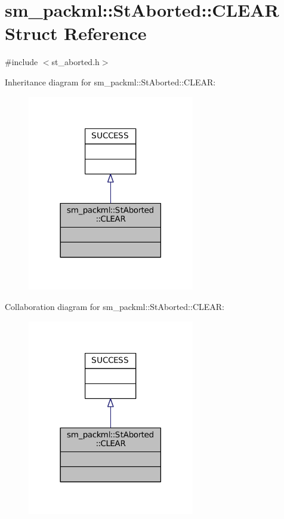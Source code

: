 \hypertarget{structsm__packml_1_1StAborted_1_1CLEAR}{}\section{sm\+\_\+packml\+:\+:St\+Aborted\+:\+:C\+L\+E\+AR Struct Reference}
\label{structsm__packml_1_1StAborted_1_1CLEAR}


{\ttfamily \#include $<$st\+\_\+aborted.\+h$>$}



Inheritance diagram for sm\+\_\+packml\+:\+:St\+Aborted\+:\+:C\+L\+E\+AR\+:
\nopagebreak
\begin{figure}[H]
\begin{center}
\leavevmode
\includegraphics[width=206pt]{structsm__packml_1_1StAborted_1_1CLEAR__inherit__graph}
\end{center}
\end{figure}


Collaboration diagram for sm\+\_\+packml\+:\+:St\+Aborted\+:\+:C\+L\+E\+AR\+:
\nopagebreak
\begin{figure}[H]
\begin{center}
\leavevmode
\includegraphics[width=206pt]{structsm__packml_1_1StAborted_1_1CLEAR__coll__graph}
\end{center}
\end{figure}


